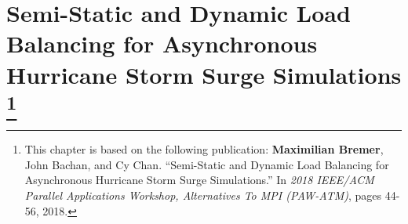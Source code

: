 


\chapter[Semi-Static and Dynamic Load Balancing for Asynchronous Hurricane Storm Surge Simulations]{Semi-Static and Dynamic Load Balancing for Asynchronous Hurricane Storm Surge Simulations%
\footnote{%
This chapter is based on the following publication: {\bf Maximilian Bremer}, John Bachan, and Cy Chan. ``Semi-Static and Dynamic Load Balancing for Asynchronous Hurricane Storm Surge Simulations.'' In {\em 2018 IEEE/ACM Parallel Applications Workshop, Alternatives To MPI (PAW-ATM)}, pages 44-56, 2018.}}
\label{ch:lb}









%

%

